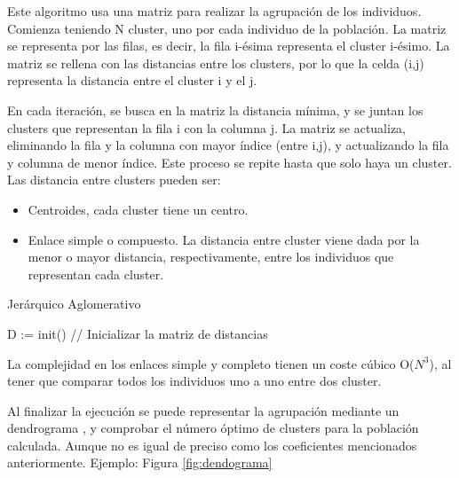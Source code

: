 Este algoritmo usa una matriz para realizar la agrupación de los individuos. Comienza teniendo N cluster, uno por cada individuo de la población. La matriz se representa por las filas, es decir, la fila i-ésima representa el cluster i-ésimo. La matriz se rellena con las distancias entre los clusters, por lo que la celda (i,j) representa la distancia entre el cluster i y el j.  

En cada iteración, se busca en la matriz la distancia mínima, y se juntan los clusters que representan la fila i con la columna j. La matriz se actualiza, eliminando la fila y la columna con mayor índice (entre i,j), y actualizando la fila y columna de menor índice. Este proceso se repite hasta que solo haya un cluster. Las distancia entre clusters pueden ser:
\begin{itemize}
\item Centroides, cada cluster tiene un centro.
\item Enlace simple o compuesto. La distancia entre cluster viene dada por la menor o mayor distancia, respectivamente, entre los individuos que representan cada cluster.
\end{itemize}



\begin{algorithm}[!h]
	\caption{Jerárquico Aglomerativo}
	D := init() // Inicializar la matriz de distancias\\
	
\end{algorithm}

\noindent La complejidad en los enlaces simple y completo tienen un coste cúbico O(\(N^{3}\)), al tener que comparar todos los individuos uno a uno entre dos cluster.

\newpage


Al finalizar la ejecución se puede representar la agrupación mediante un dendrograma \cite{espinoza2012using}, y comprobar el número óptimo de clusters para la población calculada. Aunque no es igual de preciso como los coeficientes mencionados anteriormente. Ejemplo: Figura \ref{fig:dendograma}

